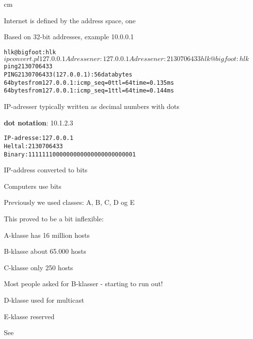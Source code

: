 \documentclass[Screen16to9,17pt]{foils}
\begin{document}

 cm

\begin{list1}
\item Internet is defined by the address space, one
\item Based on 32-bit addresses, example 10.0.0.1
\end{list1}


\begin{alltt}
hlk@bigfoot:hlk$ ipconvert.pl 127.0.0.1
Adressen er: 127.0.0.1
Adressen er: 2130706433
hlk@bigfoot:hlk$ ping 2130706433
PING 2130706433 (127.0.0.1): 56 data bytes
64 bytes from 127.0.0.1: icmp_seq=0 ttl=64 time=0.135 ms
64 bytes from 127.0.0.1: icmp_seq=1 ttl=64 time=0.144 ms
\end{alltt}

\begin{list1}
\item IP-adresser typically written as decimal numbers with dots
\item {\bf dot notation}: 10.1.2.3
\end{list1}


\begin{alltt}
IP-adresse: 127.0.0.1
Heltal:	2130706433
Binary:	1111111000000000000000000000001
\end{alltt}

\begin{list1}
\item IP-address converted to bits
\item Computers use bits
\end{list1}


\begin{list1}
\item Previously we used classes: A, B, C, D og E
\item This proved to be a bit inflexible:
\begin{list2}
\item A-klasse has 16 million hosts
\item B-klasse about 65.000 hosts
\item C-klasse only 250 hosts
\end{list2}
\item Most people asked for B-klasser - starting to run out!
\item D-klasse used for multicast
\item E-klasse reserved
\item See 
\end{list1}
\end{document}
